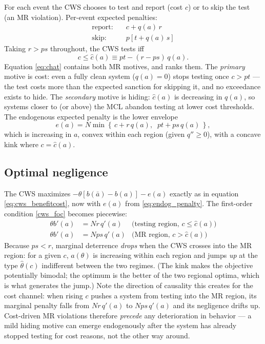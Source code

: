 \documentclass{article}
\begin{document}
For each event the CWS chooses to test and report (cost $c$) or to skip the test (an MR violation). Per-event expected penalties:
\begin{align*}
\text{report:} \quad & c + q(a)\,r \\
\text{skip:} \quad & p\left[t + q(a)\,s\right]
\end{align*}
Taking $r > ps$ throughout, the CWS tests iff
\begin{equation}\label{eq:chat}
c \le \hat{c}(a) \equiv pt - (r - ps)\,q(a).
\end{equation}
Equation \ref{eq:chat} contains both MR motives, and ranks them. The \emph{primary} motive is cost: even a fully clean system ($q(a) = 0$) stops testing once $c > pt$ --- the test costs more than the expected sanction for skipping it, and no exceedance exists to hide. The \emph{secondary} motive is hiding: $\hat{c}(a)$ is decreasing in $q(a)$, so systems closer to (or above) the MCL abandon testing at lower cost thresholds. The endogenous expected penalty is the lower envelope
\begin{equation}\label{eq:endog_penalty}
e(a) = N \min\left\{\, c + r\,q(a),\;\; pt + ps\,q(a) \,\right\},
\end{equation}
which is increasing in $a$, convex within each region (given $q'' \ge 0$), with a concave kink where $c = \hat{c}(a)$.

\subsection{Optimal negligence}

The CWS maximizes $-\theta[b(\bar{a}) - b(a)] - e(a)$ exactly as in equation \ref{eq:cws_benefitcost}, now with $e(a)$ from \ref{eq:endog_penalty}. The first-order condition \ref{cws_foc} becomes piecewise:
\begin{align}
\theta b'(a) &= N r\, q'(a) & \text{(testing region, } c \le \hat{c}(a)) \\
\theta b'(a) &= N ps\, q'(a) & \text{(MR region, } c > \hat{c}(a))
\end{align}
Because $ps < r$, marginal deterrence \emph{drops} when the CWS crosses into the MR region: for a given $c$, $a(\theta)$ is increasing within each region and jumps \emph{up} at the type $\hat{\theta}(c)$ indifferent between the two regimes. (The kink makes the objective potentially bimodal; the optimum is the better of the two regional optima, which is what generates the jump.) Note the direction of causality this creates for the cost channel: when rising $c$ pushes a system from testing into the MR region, its marginal penalty falls from $Nr\,q'(a)$ to $Nps\,q'(a)$ and its negligence drifts up. Cost-driven MR violations therefore \emph{precede} any deterioration in behavior --- a mild hiding motive can emerge endogenously after the system has already stopped testing for cost reasons, not the other way around.
\end{document}
